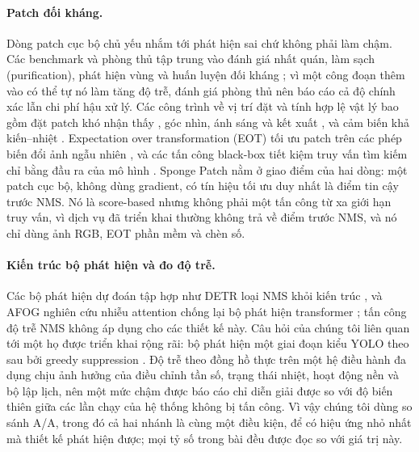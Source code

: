 \documentclass[a4paper,fleqn]{cas-dc}
\begin{document}
\paragraph{Patch đối kháng.}
Dòng patch cục bộ chủ yếu nhắm tới phát hiện sai chứ không phải làm chậm. Các benchmark và phòng thủ tập trung vào đánh giá nhất quán, làm sạch (purification), phát hiện vùng và huấn luyện đối kháng \cite{apde2025,pbcat2025,oddr2025,diffpad2025,unifiedpatchdet2025,antistyler2026,trace2026}; vì một công đoạn thêm vào có thể tự nó làm tăng độ trễ, đánh giá phòng thủ nên báo cáo cả độ chính xác lẫn chi phí hậu xử lý. Các công trình về vị trí đặt và tính hợp lệ vật lý bao gồm đặt patch khó nhận thấy \cite{iap2025}, góc nhìn, ánh sáng và kết xuất \cite{grac2025,gs3dcamo2025}, và cảm biến khả kiến--nhiệt \cite{rgbt2026,thermal2026}. Expectation over transformation (EOT) tối ưu patch trên các phép biến đổi ảnh ngẫu nhiên \cite{athalye2018eot}, và các tấn công black-box tiết kiệm truy vấn tìm kiếm chỉ bằng đầu ra của mô hình \cite{ilyas2018blackbox}. Sponge Patch nằm ở giao điểm của hai dòng: một patch cục bộ, không dùng gradient, có tín hiệu tối ưu duy nhất là điểm tin cậy trước NMS. Nó là score-based nhưng không phải một tấn công từ xa giới hạn truy vấn, vì dịch vụ đã triển khai thường không trả về điểm trước NMS, và nó chỉ dùng ảnh RGB, EOT phần mềm và chèn số.

\paragraph{Kiến trúc bộ phát hiện và đo độ trễ.}
Các bộ phát hiện dự đoán tập hợp như DETR loại NMS khỏi kiến trúc \cite{carion2020detr}, và AFOG nghiên cứu nhiễu attention chống lại bộ phát hiện transformer \cite{afog2025}; tấn công độ trễ NMS không áp dụng cho các thiết kế này. Câu hỏi của chúng tôi liên quan tới một họ được triển khai rộng rãi: bộ phát hiện một giai đoạn kiểu YOLO theo sau bởi greedy suppression \cite{redmon2016yolo,neubeck2006nms}. Độ trễ theo đồng hồ thực trên một hệ điều hành đa dụng chịu ảnh hưởng của điều chỉnh tần số, trạng thái nhiệt, hoạt động nền và bộ lập lịch, nên một mức chậm được báo cáo chỉ diễn giải được so với độ biến thiên giữa các lần chạy của hệ thống không bị tấn công. Vì vậy chúng tôi dùng so sánh A/A, trong đó cả hai nhánh là cùng một điều kiện, để có hiệu ứng nhỏ nhất mà thiết kế phát hiện được; mọi tỷ số trong bài đều được đọc so với giá trị này.
\end{document}
